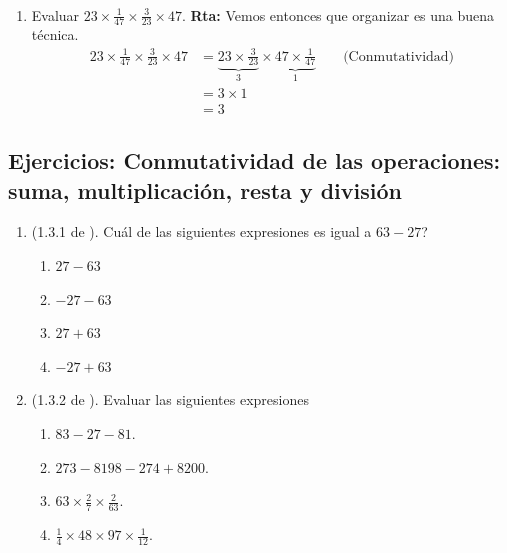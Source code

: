\begin{ejemplo}{\ \\}
\begin{enumerate}[label=\Alph*)]
					\item Evaluar $23\times \frac{1}{47}\times \frac{3}{23}\times 47$.
							\textbf{Rta: } Vemos entonces que organizar es una buena técnica.
							\begin{align*}
							23\times \frac{1}{47}\times \frac{3}{23}\times 47		&= \underbrace{23 \times \frac{3}{23} }_{3}\times \underbrace{47 \times \frac{1}{47} }_{1}  & &\text{ (Conmutatividad)}\\				
							&=3\times 1\\
							&=3
							\end{align*}				
		\end{enumerate}
\end{ejemplo}

\newpage

\begin{center}
	\vspace{-1cm}
	\subsection{ Ejercicios: Conmutatividad de las operaciones: suma, multiplicación, resta y división }\label{ejercicios_subsubsection_conmutatividad_de_operaciones}
\end{center}

\begin{enumerate}
	\item (1.3.1 de \cite{Aops_algebra}). Cuál de las siguientes expresiones es igual a $63-27$?
			\begin{multicols}{4}
				\begin{enumerate}[label=(\Alph*)]
					\item $27-63$				
					\item $-27-63$
					\item $27+63$
					\item $-27+63$
				\end{enumerate}	
			\end{multicols}
		
	\item (1.3.2 de \cite{Aops_algebra}). Evaluar las siguientes expresiones
			\begin{multicols}{2}
			\begin{enumerate}[label=\Alph*)]
				\item $83-27-81$.
				\item $273-8198-274+8200$.
				\item $63\times \frac{2}{7}\times \frac{2}{63}$.	
				\item $\frac{1}{4}\times 48\times 97\times \frac{1}{12}$.		
			\end{enumerate}	
			\end{multicols}
\end{enumerate}
\newpage

